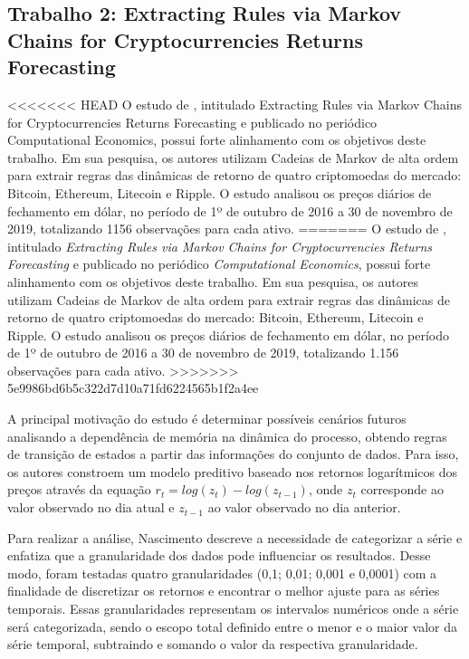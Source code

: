 \documentclass[
    12pt,                %
    openright,           %
    oneside,             %
    a4paper,             %
    english,             %
    brazil               %
]{abntex2}
\begin{document}
\subsection{Trabalho 2: Extracting Rules via Markov Chains for Cryptocurrencies Returns Forecasting}

<<<<<<< HEAD
O estudo de , intitulado Extracting Rules via Markov Chains for Cryptocurrencies Returns Forecasting e publicado no periódico Computational 
Economics, possui forte alinhamento com os objetivos deste trabalho. Em sua pesquisa, os autores utilizam Cadeias de Markov de alta ordem para extrair regras das 
dinâmicas de retorno de quatro criptomoedas do mercado: Bitcoin, Ethereum, Litecoin e Ripple. O estudo analisou os preços diários de fechamento em dólar, no período de 
1º de outubro de 2016 a 30 de novembro de 2019, totalizando 1156 observações para cada ativo.
=======
O estudo de , intitulado \textit{Extracting Rules via Markov Chains for Cryptocurrencies Returns Forecasting} e publicado no periódico \textit{Computational Economics}, possui forte alinhamento com os objetivos deste trabalho. Em sua pesquisa, os autores utilizam Cadeias de Markov de alta ordem para extrair regras das dinâmicas de retorno de quatro criptomoedas do mercado: Bitcoin, Ethereum, Litecoin e Ripple. O estudo analisou os preços diários de fechamento em dólar, no período de 1º de outubro de 2016 a 30 de novembro de 2019, totalizando 1.156 observações para cada ativo.
>>>>>>> 5e9986bd6b5c322d7d10a71fd6224565b1f2a4ee

A principal motivação do estudo é determinar possíveis cenários futuros analisando a dependência de memória na dinâmica do processo, obtendo regras de transição de 
estados a partir das informações do conjunto de dados. Para isso, os autores constroem um modelo preditivo baseado nos retornos logarítmicos dos preços através da 
equação $r_t = log(z_t) - log(z_{t-1})$, onde $z_t$ corresponde ao valor observado no dia atual e $z_{t-1}$ ao valor observado no dia anterior.

Para realizar a análise, Nascimento descreve a necessidade de categorizar a série e enfatiza que a granularidade dos dados pode influenciar os resultados. Desse modo, 
foram testadas quatro granularidades (0,1; 0,01; 0,001 e 0,0001) com a finalidade de discretizar os retornos e encontrar o melhor ajuste para as séries temporais. 
Essas granularidades representam os intervalos numéricos onde a série será categorizada, sendo o escopo total definido entre o menor e o maior valor da série temporal, subtraindo e somando o valor da respectiva granularidade.
\end{document}
